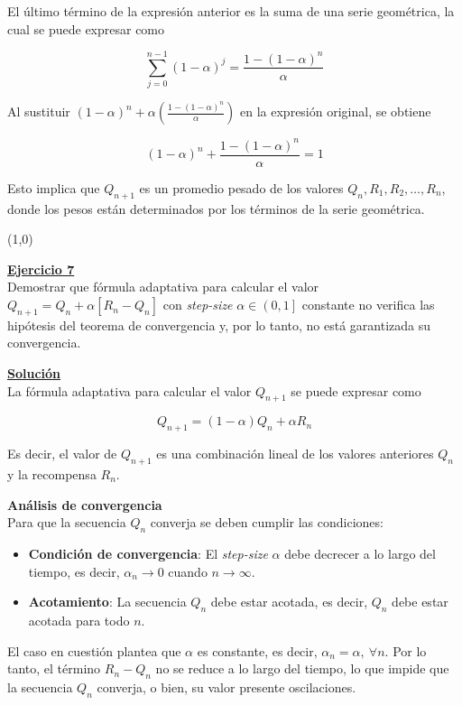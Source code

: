 \documentclass[12pt]{article}
\newlength\tindent
\renewcommand{\indent}{\hspace*{\tindent}}
\begin{document}
\begin{itemize}
    El último término de la expresión anterior es la suma de una serie geométrica, la cual se puede expresar como

    \[
        \sum_{j=0}^{n-1} \left( 1-\alpha \right)^{j} = \frac{1-(1-\alpha)^n}{\alpha}
    \]

    Al sustituir $(1-\alpha)^n + \alpha \left( \frac{1-(1-\alpha)^n}{\alpha} \right)$ en la expresión original, se obtiene

    \[
        (1-\alpha)^n + \frac{1-(1-\alpha)^n}{\alpha} = 1
    \]

    Esto implica que $Q_{n+1}$ es un promedio pesado de los valores $Q_{n},R_1,R_2,\dots,R_n$, donde los pesos están determinados por los términos de la serie geométrica.

    \line(1,0){\textwidth}

    \indent\underline{\textbf{Ejercicio 7}}\\
    Demostrar que fórmula adaptativa para calcular el valor $Q_{n+1}=Q_n+\alpha\left[R_n-Q_n\right]$ con  \textit{step-size} $\alpha\in\left(0,1\right]$ constante no verifica las hipótesis del teorema de convergencia y, por lo tanto, no está garantizada su convergencia.

    \indent\underline{\textbf{Solución}}\\
    La fórmula adaptativa para calcular el valor $Q_{n+1}$ se puede expresar como

    \[
        Q_{n+1} = (1-\alpha)Q_n + \alpha R_n
    \]

    Es decir, el valor de $Q_{n+1}$ es una combinación lineal de los valores anteriores $Q_n$ y la recompensa $R_n$.

    \textbf{Análisis de convergencia}\\
    Para que la secuencia $Q_n$ converja se deben cumplir las condiciones:

    \begin{itemize}
        \item \textbf{Condición de convergencia}: El \textit{step-size} $\alpha$ debe decrecer a lo largo del tiempo, es decir, $\alpha_n \rightarrow 0$ cuando $n \rightarrow \infty$.
        \item \textbf{Acotamiento}: La secuencia $Q_n$ debe estar acotada, es decir, $Q_n$ debe estar acotada para todo $n$.
    \end{itemize}

    El caso en cuestión plantea que $\alpha$ es constante, es decir, $\alpha_n = \alpha,\ \forall n$.
    Por lo tanto, el término $R_n - Q_n$ no se reduce a lo largo del tiempo, lo que impide que la secuencia $Q_n$ converja, o bien, su valor presente oscilaciones.


\end{itemize}
\end{document}
